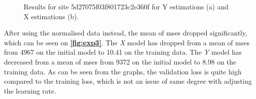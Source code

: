 \begin{figure}[H]
\centering
  \hfill
  \caption{Results for site 5d27075f03f801723c2e360f for Y estimations (a) and X estimations (b).}
  \label{fig:exp3}
\end{figure}

After using the normalised data instead, the mean of \gls{mse}s dropped significantly, which can be seen on \textbf{\autoref{fig:exp3}}. The \textit{X} model has dropped from a mean of \gls{mse}s from 4967 on the initial model to 10.41 on the training data. The \textit{Y} model has decreased from a mean of \gls{mse}s from 9372 on the initial model to 8.98 on the training data. As can be seen from the graphs, the validation loss is quite high compared to the training loss, which is not an issue of same degree with adjusting the learning rate.

